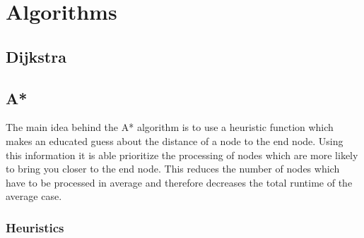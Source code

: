 \documentclass[12pt, a4paper]{article}
\begin{document}


\section{Algorithms}
\label{Algorithms}


\subsection{Dijkstra}







\subsection{A*}


The main idea behind the A* algorithm is to use a heuristic function which makes
an educated guess about the distance of a node to the end node. Using this
information it is able prioritize the processing of nodes which are more likely
to bring you closer to the end node. This reduces the number of nodes which have
to be processed in average and therefore decreases the total runtime of the
average case.



\subsubsection{Heuristics}
\label{Heuristics}
\end{document}

